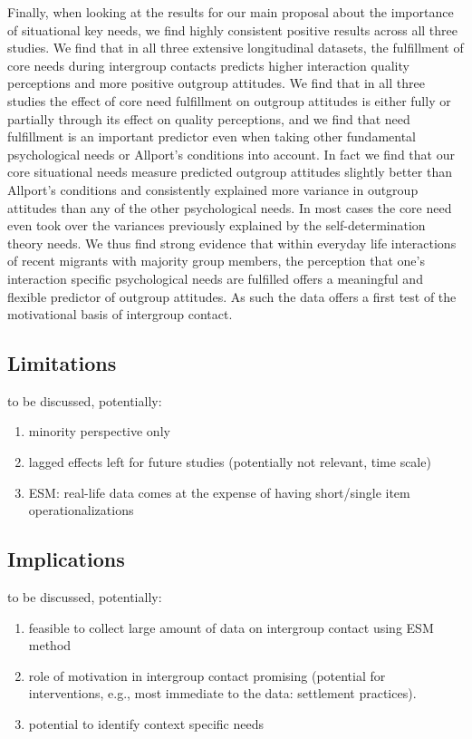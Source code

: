 \documentclass[man, 12pt, a4paper]{apa7}
\theoremstyle{break}
\theoremstyle{plain}
\begin{document}
Finally, when looking at the results for our main proposal about the importance of situational key needs, we find highly consistent positive results across all three studies. We find that in all three extensive longitudinal datasets, the fulfillment of core needs during intergroup contacts predicts higher interaction quality perceptions and more positive outgroup attitudes. We find that in all three studies the effect of core need fulfillment on outgroup attitudes is either fully or partially through its effect on quality perceptions, and we find that need fulfillment is an important predictor even when taking other fundamental psychological needs or Allport's conditions into account. In fact we find that our core situational needs measure predicted outgroup attitudes slightly better than Allport's conditions and consistently explained more variance in outgroup attitudes than any of the other psychological needs. In most cases the core need even took over the variances previously explained by the self-determination theory needs. We thus find strong evidence that within everyday life interactions of recent migrants with majority group members, the perception that one's interaction specific psychological needs are fulfilled offers a meaningful and flexible predictor of outgroup attitudes. As such the data offers a first test of the motivational basis of intergroup contact.

\subsection{Limitations}
to be discussed, potentially:
\begin{enumerate}
    \item minority perspective only
    \item lagged effects left for future studies (potentially not relevant, time scale)
    \item ESM: real-life data comes at the expense of having short/single item operationalizations
\end{enumerate}

\subsection{Implications}
to be discussed, potentially:
\begin{enumerate}
    \item feasible to collect large amount of data on intergroup contact using ESM method
    \item role of motivation in intergroup contact promising (potential for interventions, e.g., most immediate to the data: settlement practices). 
    \item potential to identify context specific needs
\end{enumerate}
\end{document}
